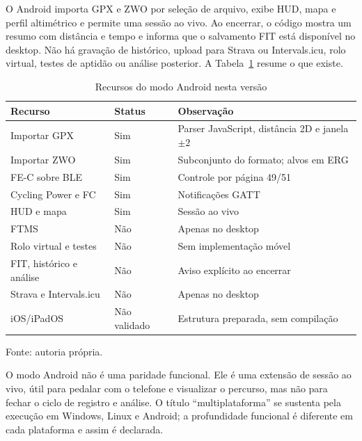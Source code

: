 O Android importa GPX e ZWO por seleção de arquivo, exibe HUD, mapa e perfil
altimétrico e permite uma sessão ao vivo. Ao encerrar, o código mostra um resumo
com distância e tempo e informa que o salvamento FIT está disponível no desktop.
Não há gravação de histórico, upload para Strava ou Intervals.icu, rolo
virtual, testes de aptidão ou análise posterior. A Tabela~\ref{tab:mobile-recursos}
resume o que existe.

\begin{table}[htbp]
    \centering
    \caption{Recursos do modo Android nesta versão}
    \label{tab:mobile-recursos}
    \small
    \begin{tabular}{@{}>{\raggedright\arraybackslash}p{4.2cm}
        >{\raggedright\arraybackslash}p{3.0cm}
        >{\raggedright\arraybackslash}p{6.4cm}@{}}
        \toprule
        \textbf{Recurso} & \textbf{Status} & \textbf{Observação} \\
        \midrule
        Importar GPX & Sim & Parser JavaScript, distância 2D e janela $\pm 2$ \\
        Importar ZWO & Sim & Subconjunto do formato; alvos em ERG \\
        FE-C sobre BLE & Sim & Controle por página 49/51 \\
        Cycling Power e FC & Sim & Notificações GATT \\
        HUD e mapa & Sim & Sessão ao vivo \\
        FTMS & Não & Apenas no desktop \\
        Rolo virtual e testes & Não & Sem implementação móvel \\
        FIT, histórico e análise & Não & Aviso explícito ao encerrar \\
        Strava e Intervals.icu & Não & Apenas no desktop \\
        iOS/iPadOS & Não validado & Estrutura preparada, sem compilação \\
        \bottomrule
    \end{tabular}
    \vspace{0.2cm}
    \par\small Fonte: autoria própria.
\end{table}

O modo Android não é uma paridade funcional. Ele é uma extensão de sessão ao
vivo, útil para pedalar com o telefone e visualizar o percurso, mas não para
fechar o ciclo de registro e análise. O título ``multiplataforma'' se sustenta
pela execução em Windows, Linux e Android; a profundidade funcional é diferente
em cada plataforma e assim é declarada.

